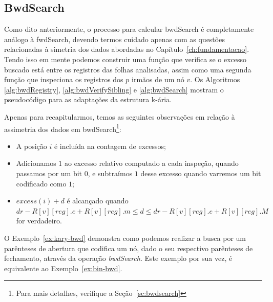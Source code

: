 \newpage
         
\subsection{BwdSearch}\label{sec:bwdSearch}
Como dito anteriormente, o processo para calcular bwdSearch é completamente análogo à fwdSearch, devendo termos cuidado apenas com as questões relacionadas à simetria dos dados abordadas no Capítulo~\ref{ch:fundamentacao}. Tendo isso em mente podemos construir uma função que verifica se o excesso buscado está entre os registros das folhas analisadas, assim como uma segunda função que inspeciona os registros dos $p$ irmãos de um nó $v$. Os Algoritmos \ref{alg:bwdRegistry}, \ref{alg:bwdVerifySibling} e \ref{alg:bwdSearch} mostram o pseudocódigo para as adaptações da estrutura k-ária.

Apenas para recapitularmos, temos as seguintes observações em relação à assimetria dos dados em  bwdSearch\footnote{Para mais detalhes, verifique a Seção~\ref{sc:bwdsearch}}:
\begin{itemize}
    \item A posição $i$ é incluída na contagem de excessos;
    \item Adicionamos $1$ ao excesso relativo computado a cada inspeção, quando passamos por um bit $0$, e subtraímos $1$ desse excesso quando varremos um bit codificado como $1$;
    \item $excess(i) + d $ é alcançado quando $dr - R[v][reg].e + R[v][reg].m \leq d \leq dr - R[v][reg].e + R[v][reg].M $ for verdadeiro.
\end{itemize}

O Exemplo~\ref{ex:kary-bwd}  demonstra como podemos realizar a busca por um parênteses de abertura que codifica um nó, dado o seu respectivo parênteses de fechamento, através da operação \textit{bwdSearch}. Este exemplo por sua vez, é equivalente ao Exemplo~\ref{ex:bin-bwd}.

